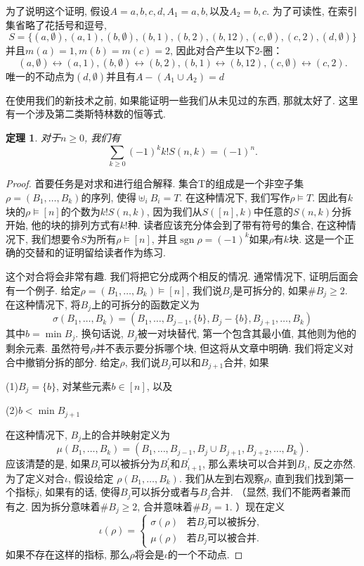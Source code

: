 \documentclass{ctexbook}
\newtheorem{thm}{定理}[section]
\begin{document}
	为了说明这个证明, 假设$A={a,b,c,d},A_{1}={a,b},以及A_{2}={b,c}$. 为了可读性, 在索引集省略了花括号和逗号,
\[
	S=\{(a, \emptyset),(a, 1),(b, \emptyset),(b, 1),(b, 2),(b, 12),(c, \emptyset),(c, 2),(d, \emptyset)\}
\]
	并且$m(a)=1,m(b)=m(c)=2$, 因此对合产生以下2-圈：
\[
(a, \emptyset) \leftrightarrow(a, 1),(b, \emptyset) \leftrightarrow(b, 2),(b, 1) \leftrightarrow(b, 12),(c, \emptyset) \leftrightarrow(c, 2).
\]
	唯一的不动点为$(d, \emptyset)$并且有$A-(A_{1} \cup A_{2})={d}$

	在使用我们的新技术之前, 如果能证明一些我们从未见过的东西, 那就太好了. 这里有一个涉及第二类斯特林数的恒等式.
\begin{thm}
	对于$n\geq 0$, 我们有
	\[
	\sum_{k \geq 0}(-1)^{k} k ! S(n, k)=(-1)^{n}.
	\]
\end{thm}
\begin{proof}
	首要任务是对求和进行组合解释. 集合T的组成是一个非空子集$\rho=\left(B_{1}, \ldots, B_{k}\right)$的序列, 使得$\uplus_{i} B_{i}=T$. 在这种情况下, 我们写作$\rho \vDash T$. 因此有$k$块的$\rho \vDash [n]$的个数为$k!S(n,k)$, 因为我们从$S([n],k)$中任意的$S(n,k)$分拆开始, 他的块的排列方式有$k!$种. 读者应该充分体会到了带有符号的集合, 在这种情况下, 我们想要令$S$为所有$\rho \vDash [n]$, 并且$\operatorname{sgn} \rho=(-1)^k$如果$\rho$有$k$块. 这是一个正确的交替和的证明留给读者作为练习.
	
	这个对合将会非常有趣. 我们将把它分成两个相反的情况. 通常情况下, 证明后面会有一个例子. 给定$\rho =(B_{1}, \ldots, B_{k})\vDash [n]$, 我们说$B_{j}$是可拆分的, 如果$\# B_{j}\geq 2$. 在这种情况下, 将$B_{j}$上的可拆分的函数定义为
	\[
	\sigma\left(B_{1}, \ldots, B_{k}\right)=\left(B_{1}, \ldots, B_{j-1},\{b\}, B_{j}-\{b\}, B_{j+1}, \ldots, B_{k}\right)
	\]
	其中$b=\operatorname{min}B_{j}$. 换句话说, $B_{j}$被一对块替代, 第一个包含其最小值, 其他则为他的剩余元素. 虽然符号$\rho$并不表示要分拆哪个块, 但这将从文章中明确. 我们将定义对合中撤销分拆的部分. 给定$\rho$, 我们说$B_{j}$可以和$B_{j+1}$合并, 如果
	
	(1)$B_{j}=\{b\}$, 对某些元素$b\in [n]$, 以及
	
	(2)$b<\operatorname{min}B_{j+1}$
	
	\noindent 在这种情况下, $B_{j}$上的合并映射定义为
	\[
	\mu(B_{1},\ldots,B_{k})=(B_{1},\ldots,B_{j-1},B_{j}\cup B_{j+1},B_{j+2},\ldots,B_{k}).
	\]
	应该清楚的是, 如果$B_{i}$可以被拆分为$B_{i}^{'}$和$B_{i+1}^{'}$, 那么素块可以合并到$B_{i}$, 反之亦然. 为了定义对合$\iota$, 假设给定
	$\rho (B_{1},\ldots,B_{k})$. 我们从左到右观察$\rho$, 直到我们找到第一个指标$j$, 如果有的话, 使得$B_{j}$可以拆分或者与$B_{j}$合并. （显然, 我们不能两者兼而有之. 因为拆分意味着$\# B_{j}\geq 2$, 合并意味着$\# B_{j}=1$. ）现在定义
	\[
	\iota (\rho)=\left\{\begin{array}{cc}
	\sigma(\rho) & \text{若} B_{j}\text{可以被拆分, }\\
	\mu(\rho) & \text{若} B_{j}\text{可以被合并. }
	\end{array}\right.
	\]
	如果不存在这样的指标, 那么$\rho$将会是$\iota$的一个不动点.
	

\end{proof}
\end{document}
